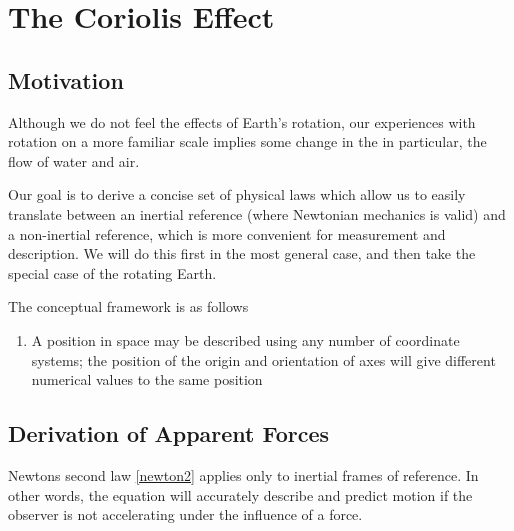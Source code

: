 \chapter{The Coriolis Effect}
\section{Motivation}
Although we do not feel the effects of Earth's rotation, our experiences with rotation on a more familiar scale implies some change in the in particular, the flow of water and air. 

Our goal is to derive a concise set of physical laws which allow us to easily translate between an inertial reference (where Newtonian mechanics is valid) and a non-inertial reference, which is more convenient for measurement and description. We will do this first in the most general case, and then take the special case of the rotating Earth.

The conceptual framework is as follows
\begin{enumerate}
\item A position in space may be described using any number of coordinate systems; the position of the origin and orientation of axes will give different numerical values to the same position 
\end{enumerate}



\section{Derivation of Apparent Forces}
Newtons second law \cref{newton2} applies only to inertial frames of reference. In other words, the equation will accurately describe and predict motion if the observer is not accelerating under the influence of a force.